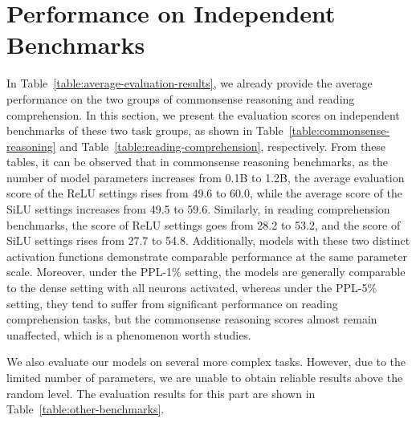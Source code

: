 \documentclass{article} %
\begin{document}
\section{Performance on Independent Benchmarks} \label{sec:independent-benchmark}

In Table~\ref{table:average-evaluation-results}, we already provide the average performance on the two groups of commonsense reasoning and reading comprehension. In this section, we present the evaluation scores on independent benchmarks of these two task groups, as shown in Table~\ref{table:commonsense-reasoning} and Table~\ref{table:reading-comprehension}, respectively.
From these tables, it can be observed that in commonsense reasoning benchmarks, as the number of model parameters increases from 0.1B to 1.2B, the average evaluation score of the ReLU settings rises from 49.6 to 60.0, while the average score of the SiLU settings increases from 49.5 to 59.6. Similarly, in reading comprehension benchmarks, the score of ReLU settings goes from 28.2 to 53.2, and the score of SiLU settings rises from 27.7 to 54.8. Additionally, models with these two distinct activation functions demonstrate comparable performance at the same parameter scale. Moreover, under the PPL-1\% setting, the models are generally comparable to the dense setting with all neurons activated, whereas under the PPL-5\% setting, they tend to suffer from significant performance on reading comprehension tasks, but the commonsense reasoning scores almost remain unaffected, which is a phenomenon worth studies.

We also evaluate our models on several more complex tasks. However, due to the limited number of parameters, we are unable to obtain reliable results above the random level. The evaluation results for this part are shown in Table~\ref{table:other-benchmarks}.
\end{document}
